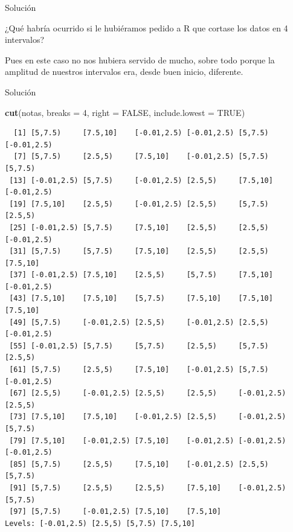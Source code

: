 \documentclass[
  ignorenonframetext,
]{beamer}
\newenvironment{Shaded}{\begin{snugshade}}{\end{snugshade}}
\newcommand{\DataTypeTok}[1]{\textcolor[rgb]{0.13,0.29,0.53}{#1}}
\newcommand{\DecValTok}[1]{\textcolor[rgb]{0.00,0.00,0.81}{#1}}
\newcommand{\KeywordTok}[1]{\textcolor[rgb]{0.13,0.29,0.53}{\textbf{#1}}}
\newcommand{\NormalTok}[1]{#1}
\newcommand{\OtherTok}[1]{\textcolor[rgb]{0.56,0.35,0.01}{#1}}
\begin{document}
\begin{frame}{Solución}
\protect\hypertarget{soluciuxf3n-22}{}

¿Qué habría ocurrido si le hubiéramos pedido a R que cortase los datos
en 4 intervalos?

Pues en este caso no nos hubiera servido de mucho, sobre todo porque la
amplitud de nuestros intervalos era, desde buen inicio, diferente.

\end{frame}

\begin{frame}[fragile]{Solución}
\protect\hypertarget{soluciuxf3n-23}{}

\begin{Shaded}
\begin{Highlighting}[]
\KeywordTok{cut}\NormalTok{(notas, }\DataTypeTok{breaks =} \DecValTok{4}\NormalTok{, }\DataTypeTok{right =} \OtherTok{FALSE}\NormalTok{, }\DataTypeTok{include.lowest =} \OtherTok{TRUE}\NormalTok{)}
\end{Highlighting}
\end{Shaded}

\begin{verbatim}
  [1] [5,7.5)     [7.5,10]    [-0.01,2.5) [-0.01,2.5) [5,7.5)     [-0.01,2.5)
  [7] [5,7.5)     [2.5,5)     [7.5,10]    [-0.01,2.5) [5,7.5)     [5,7.5)    
 [13] [-0.01,2.5) [5,7.5)     [-0.01,2.5) [2.5,5)     [7.5,10]    [-0.01,2.5)
 [19] [7.5,10]    [2.5,5)     [-0.01,2.5) [2.5,5)     [5,7.5)     [2.5,5)    
 [25] [-0.01,2.5) [5,7.5)     [7.5,10]    [2.5,5)     [2.5,5)     [-0.01,2.5)
 [31] [5,7.5)     [5,7.5)     [7.5,10]    [2.5,5)     [2.5,5)     [7.5,10]   
 [37] [-0.01,2.5) [7.5,10]    [2.5,5)     [5,7.5)     [7.5,10]    [-0.01,2.5)
 [43] [7.5,10]    [7.5,10]    [5,7.5)     [7.5,10]    [7.5,10]    [7.5,10]   
 [49] [5,7.5)     [-0.01,2.5) [2.5,5)     [-0.01,2.5) [2.5,5)     [-0.01,2.5)
 [55] [-0.01,2.5) [5,7.5)     [5,7.5)     [2.5,5)     [5,7.5)     [2.5,5)    
 [61] [5,7.5)     [2.5,5)     [7.5,10]    [-0.01,2.5) [5,7.5)     [-0.01,2.5)
 [67] [2.5,5)     [-0.01,2.5) [2.5,5)     [2.5,5)     [-0.01,2.5) [2.5,5)    
 [73] [7.5,10]    [7.5,10]    [-0.01,2.5) [2.5,5)     [-0.01,2.5) [5,7.5)    
 [79] [7.5,10]    [-0.01,2.5) [7.5,10]    [-0.01,2.5) [-0.01,2.5) [-0.01,2.5)
 [85] [5,7.5)     [2.5,5)     [7.5,10]    [-0.01,2.5) [2.5,5)     [5,7.5)    
 [91] [5,7.5)     [2.5,5)     [2.5,5)     [7.5,10]    [-0.01,2.5) [5,7.5)    
 [97] [5,7.5)     [-0.01,2.5) [7.5,10]    [7.5,10]   
Levels: [-0.01,2.5) [2.5,5) [5,7.5) [7.5,10]
\end{verbatim}

\end{frame}
\end{document}
